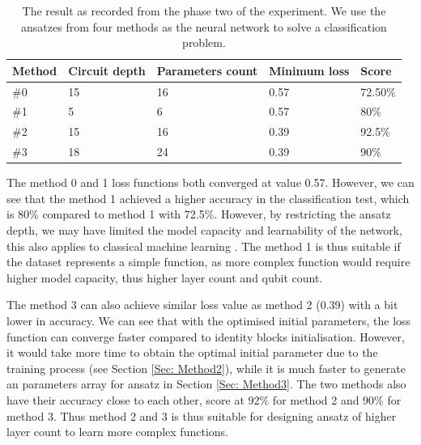 \begin{table}
    \centering
    \begin{tabular}{|| l l l l l ||}
        \hline
        \textbf{Method} & \textbf{Circuit depth} & \textbf{Parameters count} & \textbf{Minimum loss} & \textbf{Score} \\
        \hline \hline
        \#0             & 15                     & 16                        & 0.57                  & 72.50\%        \\
        \#1             & 5                      & 6                         & 0.57                  & 80\%           \\
        \#2             & 15                     & 16                        & 0.39                  & 92.5\%         \\
        \#3             & 18                     & 24                        & 0.39                  & 90\%           \\
        \hline
    \end{tabular}
    \caption{
        The result as recorded from the phase two of the experiment.
        We use the ansatzes from four methods as the neural network to solve a classification problem.
    }
    \label{Tab: Experiment Phase 2 Res}
\end{table}

The method 0 and 1 loss functions both converged at value 0.57.
However, we can see that the method 1 achieved a higher accuracy in the classification test, which is 80\% compared to method 1 with 72.5\%.
However, by restricting the ansatz depth, we may have limited the model capacity and learnability of the network, this also applies to classical machine learning \cite{ianDeepLearningAdaptive2016}.
The method 1 is thus suitable if the dataset represents a simple function, as more complex function would require higher model capacity, thus higher layer count and qubit count.

The method 3 can also achieve similar loss value as method 2 (0.39) with a bit lower in accuracy.
We can see that with the optimised initial parameters, the loss function can converge faster compared to identity blocks initialisation.
However, it would take more time to obtain the optimal initial parameter due to the training process (see Section \ref{Sec: Method2}), while it is much faster to generate an parameters array for ansatz in Section \ref{Sec: Method3}.
The two methods also have their accuracy close to each other, score at 92\% for method 2 and 90\% for method 3.
Thus method 2 and 3 is thus suitable for designing ansatz of higher layer count to learn more complex functions.


